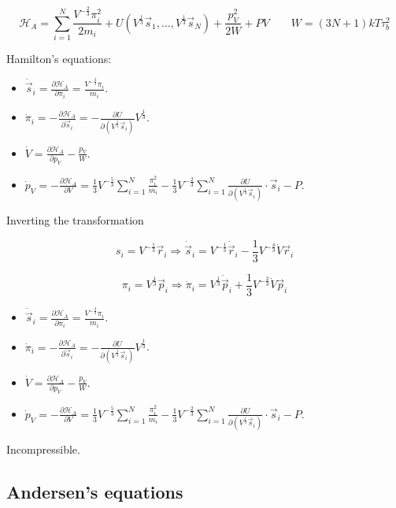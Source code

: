 $$\mathcal{H}_A = \sum\limits_{i=1}^N\frac{V^{-\frac{2}{3}}\pi_i^2}{2m_i}+ U(V^\frac{1}{3}\vec{s}_1, \dots, V^{\frac{1}{3}}\vec{s}_N) + \frac{p_V^2}{2W} + PV\qquad W = (3N+1)kT\tau_b^2$$

Hamilton's equations:

\begin{itemize}
	\item $\dot{\vec{s}}_i = \frac{\partial \mathcal{H}_A}{\partial\pi_i} = \frac{V^{-\frac{2}{3}}\pi_i}{m_i}$.
	\item $\dot{\pi}_i = -\frac{\partial\mathcal{H}_A}{\partial\vec{s}_i} = -\frac{\partial U}{\partial (V^{\frac{1}{3}}\vec{s}_i)}V^{\frac{1}{3}}$.
	\item $\dot{V} = \frac{\partial\mathcal{H}_A}{\partial p_V}-\frac{p_V}{W}$.
	\item $\dot{p}_V = -\frac{\partial\mathcal{H}_A}{\partial V} = \frac{1}{3}V^{-\frac{5}{3}}\sum\limits_{i=1}^N\frac{\pi_i^2}{m_i}-\frac{1}{3}V^{-\frac{2}{3}}\sum\limits_{i=1}^N\frac{\partial U}{\partial(V^{\frac{1}{3}}\vec{s}_i)}\cdot\vec{s}_i-P$.
\end{itemize}

Inverting the transformation

$$s_i = V^{-\frac{1}{3}}\vec{r}_i\Rightarrow \dot{\vec{s}}_i = V^{-\frac{1}{3}}\dot{\vec{r}}_i-\frac{1}{3}V^{-\frac{4}{3}}\dot{V}\vec{r}_i$$

$$\pi_i = V^{\frac{1}{3}}\vec{p}_i \Rightarrow \dot{\pi}_i = V^{\frac{1}{3}}\dot{\vec{p}}_i + \frac{1}{3}V^{-\frac{2}{3}}\dot{V}\vec{p}_i$$

\begin{itemize}
	\item $\dot{\vec{s}}_i = \frac{\partial \mathcal{H}_A}{\partial\pi_i} = \frac{V^{-\frac{2}{3}}\pi_i}{m_i}$.
	\item $\dot{\pi}_i = -\frac{\partial\mathcal{H}_A}{\partial\vec{s}_i} = -\frac{\partial U}{\partial (V^{\frac{1}{3}}\vec{s}_i)}V^{\frac{1}{3}}$.
	\item $\dot{V} = \frac{\partial\mathcal{H}_A}{\partial p_V}-\frac{p_V}{W}$.
	\item $\dot{p}_V = -\frac{\partial\mathcal{H}_A}{\partial V} = \frac{1}{3}V^{-\frac{5}{3}}\sum\limits_{i=1}^N\frac{\pi_i^2}{m_i}-\frac{1}{3}V^{-\frac{2}{3}}\sum\limits_{i=1}^N\frac{\partial U}{\partial(V^{\frac{1}{3}}\vec{s}_i)}\cdot\vec{s}_i-P$.
\end{itemize}

Incompressible.

	\subsection{Andersen's equations}

